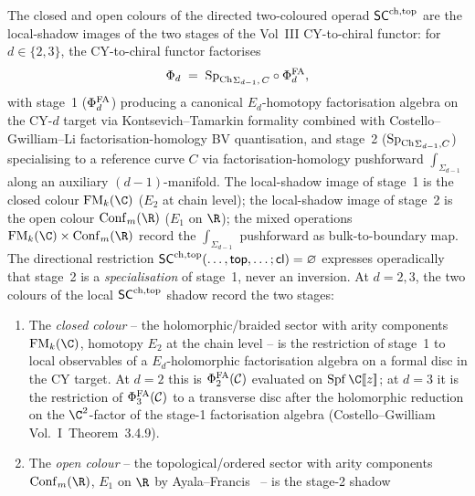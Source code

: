 \begin{lemma}
\label{lem:heptagon-two-stage-CY-to-chiral}%
\label{rem:heptagon-two-stage-CY-to-chiral}%
%
%
The closed and open colours of the directed two-coloured operad
$\mathsf{SC}^{\mathrm{ch},\mathrm{top}}$ are
the local-shadow images of the two stages of the Vol~III CY-to-chiral
functor: for $d \in \{2, 3\}$, the CY-to-chiral functor factorises
\[
 \Phi_d \;=\; {\mathrm{Sp}_{\mathrm{Ch}}}_{\Sigma_{d-1},\,C}\circ\Phi^{\mathrm{FA}}_d,
\]
with stage~1 ($\Phi^{\mathrm{FA}}_d$) producing a canonical $E_d$-homotopy
factorisation algebra on the CY-$d$ target via
Kontsevich--Tamarkin formality combined with
Costello--Gwilliam--Li factorisation-homology BV quantisation, and
stage~2 (${\mathrm{Sp}_{\mathrm{Ch}}}_{\Sigma_{d-1},C}$) specialising to a reference
curve $C$ via factorisation-homology pushforward
$\int_{\Sigma_{d-1}}$ along an auxiliary $(d-1)$-manifold. The
local-shadow image of stage~1 is the closed colour
$\FM_k(\C)$ \textup($E_2$ at chain level\textup); the local-shadow image
of stage~2 is the open colour $\Conf_m(\R)$ \textup($E_1$ on $\R$\textup);
the mixed operations $\FM_k(\C) \times \Conf_m(\R)$ record the
$\int_{\Sigma_{d-1}}$ pushforward as bulk-to-boundary map. The
directional restriction
$\mathsf{SC}^{\mathrm{ch},\mathrm{top}}(\ldots, \mathsf{top}, \ldots; \mathsf{cl}) = \varnothing$
expresses operadically that stage~2 is a \emph{specialisation} of
stage~1, never an inversion.
At $d = 2, 3$, the two colours of the local $\mathsf{SC}^{\mathrm{ch},\mathrm{top}}$ shadow record
the two stages:
\begin{enumerate}[label=\textup{(\roman*)}]
\item The \emph{closed colour} -- the holomorphic/braided sector
with arity components $\FM_k(\C)$, homotopy $E_2$ at the chain
level -- is the restriction of stage~1 to local observables of a
$E_d$-holomorphic factorisation algebra on a formal disc in the
CY target. At $d = 2$ this is $\Phi^{\mathrm{FA}}_2(\mathcal{C})$ evaluated on
$\mathrm{Spf}\,\C[\![z]\!]$; at $d = 3$ it is the restriction of
$\Phi^{\mathrm{FA}}_3(\mathcal{C})$ to a transverse disc after the holomorphic
reduction on the $\C^2$-factor of the stage-1 factorisation
algebra (Costello--Gwilliam Vol.~I~Theorem~3.4.9).
\item The \emph{open colour} -- the topological/ordered sector
with arity components $\Conf_m(\R)$, $E_1$ on $\R$ by
Ayala--Francis~\cite{AF15} -- is the stage-2 shadow

\end{enumerate}
\end{lemma}
